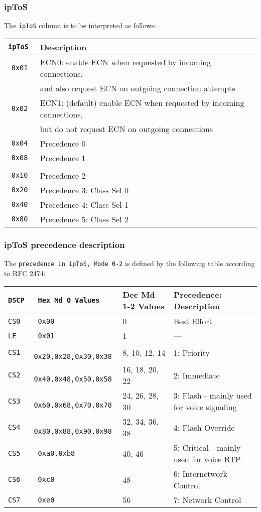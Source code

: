 \documentclass[documentation]{subfiles}
\begin{document}
\subsubsection{ipToS}\label{ipToS}
The {\tt ipToS} column is to be interpreted as follows:
\begin{longtable}{>{\tt}rl}
    \toprule
    {\bf ipToS} & {\bf Description}\\
    \midrule\endhead%
    0x01 & ECN0: enable ECN when requested by incoming connections,\\
         & \qquad and also request ECN on outgoing connection attempts\\
    0x02 & ECN1: (default) enable ECN when requested by incoming connections,\\
         & \qquad but do not request ECN on outgoing connections\\
    0x04 & Precedence 0\\
    0x08 & Precedence 1\\
    \\
    0x10 & Precedence 2\\
    0x20 & Precedence 3: Class Sel 0\\
    0x40 & Precedence 4: Class Sel 1\\
    0x80 & Precedence 5: Class Sel 2\\
    \bottomrule
\end{longtable}

\subsubsection{ipToS precedence description}\label{ipToSDesc}
The {\tt precedence in ipToS, Mode 0-2} is defined by the following table according to RFC 2474:
\begin{longtable}{>{\tt}l>{\tt}lll}
    \toprule
    {\bf DSCP} & {\bf Hex Md 0 Values} & {\bf Dec Md 1-2 Values} & {\bf Precedence: Description}\\
    \midrule\endhead%
    CS0 & 0x00                & 0              & Best Effort\\
    LE  & 0x01                & 1              & ---\\
    CS1 & 0x20,0x28,0x30,0x38 & 8, 10, 12, 14  & 1: Priority\\
    CS2 & 0x40,0x48,0x50,0x58 & 16, 18, 20, 22 & 2: Immediate\\
    CS3 & 0x60,0x68,0x70,0x78 & 24, 26, 28, 30 & 3: Flash - mainly used for voice signaling\\
    CS4 & 0x80,0x88,0x90,0x98 & 32, 34, 36, 38 & 4: Flash Override\\
    CS5 & 0xa0,0xb8           & 40, 46         & 5: Critical - mainly used for voice RTP\\
    CS6 & 0xc0                & 48             & 6: Internetwork Control\\
    CS7 & 0xe0                & 56             & 7: Network Control\\
    \bottomrule
\end{longtable}
\end{document}
